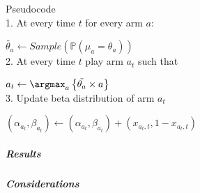 Pseudocode\\

1. At every time $t$ for every arm $a$:

$\tilde{\theta_{a}} \leftarrow Sample(\mathbb P(\mu_{a}=\theta_{a}))$ \\

2. At every time $t$ play arm $a_{t}$ such that 

$a_{t} \leftarrow \argmax_a \left\{ \tilde{\theta_{a}} \times a \right\} $ \\

3.  Update beta distribution of arm $a_{t}$

$(\alpha_{a_{t}}, \beta_{a_{t}}) \leftarrow (\alpha_{a_{t}}, \beta_{a_{t}}) + (x_{a_{t},t}, 1 - x_{a_{t},t})$


\subparagraph*{Results}
\subparagraph*{Considerations}